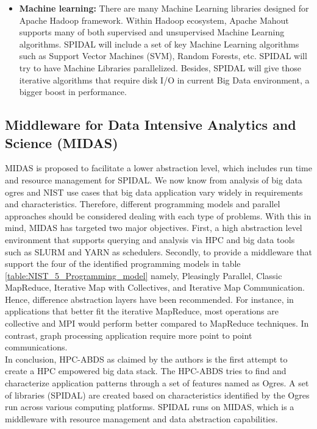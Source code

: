 \documentclass[runningheads,a4paper]{llncs}
\begin{document}
{\begin{itemize}
	\item \textbf{Machine learning:} There are many Machine Learning libraries designed for Apache Hadoop framework. Within Hadoop ecosystem, Apache Mahout supports many of both supervised and unsupervised Machine Learning algorithms. SPIDAL will include a set of key Machine Learning algorithms such as Support Vector Machines (SVM), Random Forests, etc. SPIDAL will try to have Machine Libraries parallelized. Besides, SPIDAL will give those iterative algorithms that require disk I/O in current Big Data environment, a bigger boost in performance.  
\end{itemize}

\subsection*{Middleware for Data Intensive Analytics and Science (MIDAS)}

MIDAS is proposed to facilitate a lower abstraction level, which includes run time and resource management for SPIDAL. We now know from analysis of big data ogres and NIST use cases that big data application vary widely in requirements and characteristics. Therefore, different programming models and parallel approaches should be considered dealing with each type of problems. With this in mind, MIDAS has targeted two major objectives. First, a high abstraction level environment that supports querying and analysis via HPC and big data tools such as SLURM and YARN as schedulers. Secondly, to provide a middleware that support the four of the identified programming models in table \ref{table:NIST_5_Programming_model} namely, Pleasingly Parallel, Classic MapReduce, Iterative Map with Collectives, and Iterative Map Communication. Hence, difference abstraction layers have been recommended. For instance, in applications that better fit the iterative MapReduce, most operations are collective and MPI would perform better compared to MapReduce techniques. In contrast, graph processing application require more point to point communications.\\

In conclusion, HPC-ABDS as claimed by the authors is the first attempt to create a HPC empowered big data stack. The HPC-ABDS tries to find and characterize application patterns through a set of features named as Ogres. A set of libraries (SPIDAL) are created based on characteristics identified by the Ogres run across various computing platforms. SPIDAL runs on MIDAS, which is a middleware with resource management and data abstraction capabilities. 

}
\end{document}
